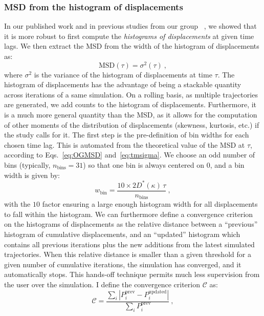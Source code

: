\subsubsection{MSD from the histogram of displacements}
In our published work and in previous studies from our group ~\cite{millan_numerical_2023}, we showed that it is more robust to first compute the \emph{histograms of displacements} at given time lags. We then extract the MSD from the width of the histogram of displacements as:
\begin{equation}
    \mathrm{MSD}(\tau) = \sigma^2(\tau)~,
    \label{eq:tmsigma}
\end{equation}
where $\sigma^2$ is the variance of the histogram of displacements at time $\tau$. The histogram of displacements has the advantage of being a stackable quantity across iterations of a same simulation. On a rolling basis, as multiple trajectories are generated, we add counts to the histogram of displacements. Furthermore, it is a much more general quantity than the MSD, as it allows for the computation of other moments of the distribution of displacements (skewness, kurtosis, etc.) if the study calls for it. The first step is the pre-definition of bin widths for each chosen time lag. This is automated from the theoretical value of the MSD at $\tau$, according to Eqs.~\ref{eq:OGMSD} and~\ref{eq:tmsigma}. We choose an odd number of bins (typically, $n_\mathrm{bins} = 31$) so that one bin is always centered on 0, and a bin width is given by:
\begin{equation}
    w_\mathrm{bin} = \dfrac{10 \times 2D^*(\kappa) \, \tau}{n_\mathrm{bins}}~,
    \label{eq:binwidth}
\end{equation}
with the $10$ factor ensuring a large enough histogram width for all displacements to fall within the histogram. We can furthermore define a convergence criterion on the histograms of displacements as the relative distance between a ``previous'' histogram of cumulative displacements, and an ``updated'' histogram which contains all previous iterations plus the new additions from the latest simulated trajectories. When this relative distance is smaller than a given threshold for a given number of cumulative iterations, the simulation has converged, and it automatically stops. This hands-off technique permits much less supervision from the user over the simulation. I define the convergence criterion $\mathcal{C}$ as:
\begin{equation}
    \mathcal{C} = \dfrac{\sum_i |P_i^\mathrm{prev} - P_i^\mathrm{updated}|}{\sum_i P_i^\mathrm{prev}}~,
\end{equation}

